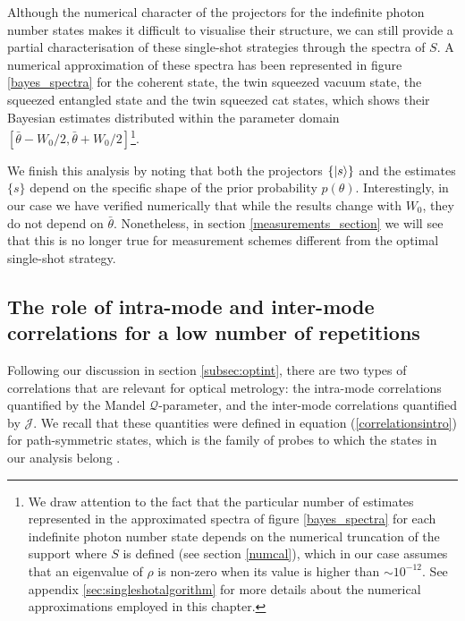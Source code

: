 Although the numerical character of the projectors for the indefinite photon number states makes it difficult to visualise their structure, we can still provide a partial characterisation of these single-shot strategies through the spectra of $S$. A numerical approximation of these spectra has been represented in figure \ref{bayes_spectra} for the coherent state, the twin squeezed vacuum state, the squeezed entangled state and the twin squeezed cat states, which shows their Bayesian estimates distributed within the parameter domain $[\bar{\theta}-W_0/2,\bar{\theta}+W_0/2]$\footnote{We draw attention to the fact that the particular number of estimates represented in the approximated spectra of figure \ref{bayes_spectra} for each indefinite photon number state depends on the numerical truncation of the support where $S$ is defined (see section \ref{numcal}), which in our case assumes that an eigenvalue of $\rho$ is non-zero when its value is higher than $\sim 10^{-12}$. See appendix \ref{sec:singleshotalgorithm} for more details about the numerical approximations employed in this chapter.}.

We finish this analysis by noting that both the projectors $\lbrace \ket{s} \rbrace$ and the estimates $\lbrace s \rbrace$ depend on the specific shape of the prior probability $p(\theta)$. Interestingly, in our case we have verified numerically that while the results change with $W_0$, they do not depend on $\bar{\theta}$. Nonetheless, in section \ref{measurements_section} we will see that this is no longer true for measurement schemes different from the optimal single-shot strategy.

\subsection{The role of intra-mode and inter-mode correlations for a low number of repetitions}\label{correlations_section}

Following our discussion in section \ref{subsec:optint}, there are two types of correlations that are relevant for optical metrology: the intra-mode correlations quantified by the Mandel $\mathcal{Q}$-parameter, and the inter-mode correlations quantified by $\mathcal{J}$. We recall that these quantities were defined in equation (\ref{correlationsintro}) for path-symmetric states, which is the family of probes to which the states in our analysis belong \cite{PaulProctor2016, sahota2015, HofmannHolger2009}. 

